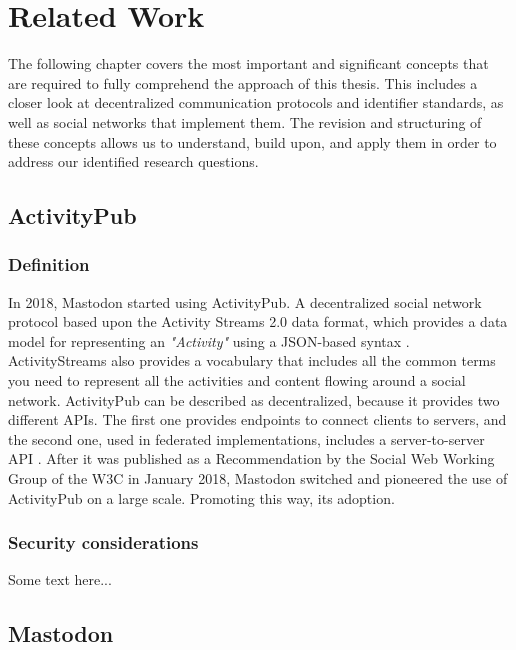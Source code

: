 \chapter{Related Work}
\label{cha:relatedwork}


The following chapter covers the most important and significant concepts that are required to fully comprehend the approach of this thesis. This includes a closer look at decentralized  communication protocols and identifier standards, as well as social networks that implement them. The revision and structuring of these concepts allows us to understand, build upon, and apply them in order to address our identified research questions. 

\section{ActivityPub}

\subsection{Definition}
In 2018, Mastodon started using ActivityPub. A decentralized social network protocol based upon the Activity Streams 2.0 data format, which provides a data model for representing an \emph{"Activity"} using a JSON-based syntax \cite{snell_prodromou_2017}. ActivityStreams also provides a vocabulary that includes all the common terms you need to represent all the activities and content flowing around a social network. ActivityPub can be described as decentralized, because it provides two different APIs. The first one provides endpoints to connect clients to servers, and the second one, used in federated implementations, includes a server-to-server API \cite{lemmer-webber_tallon_guy_prodromou_2018}. After it was published as a Recommendation by the Social Web Working Group of the W3C in January 2018, Mastodon switched and pioneered the use of ActivityPub on a large scale. Promoting this way, its adoption.

\subsection{Security considerations}
Some text here...

\section{Mastodon}
